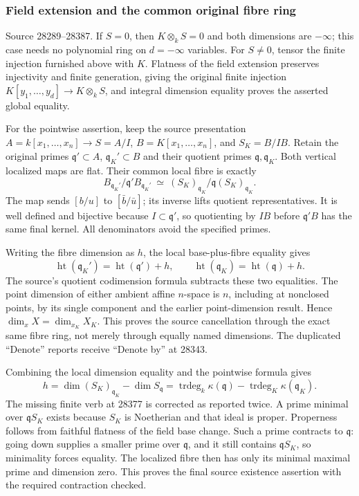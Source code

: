 \subsubsection{Field extension and the common original fibre ring}\label{field-extension-and-the-common-original-fibre-ring}

Source 28289--28387. If \(S=0\), then \(K\otimes_k S=0\) and both dimensions are \(-\infty\); this case needs no polynomial ring on \(d=-\infty\) variables. For \(S\ne0\), tensor the finite injection furnished above with \(K\). Flatness of the field extension preserves injectivity and finite generation, giving the original finite injection \(K[y_1,\ldots,y_d]\to K\otimes_kS\), and integral dimension equality proves the asserted global equality.

For the pointwise assertion, keep the source presentation \(A=k[x_1,\ldots,x_n]\to S=A/I\), \(B=K[x_1,\ldots,x_n]\), and \(S_K=B/IB\). Retain the original primes \(\mathfrak q'\subset A\), \(\mathfrak q_K'\subset B\) and their quotient primes \(\mathfrak q,\mathfrak q_K\). Both vertical localized maps are flat. Their common local fibre is exactly \[
 B_{\mathfrak q_K'}/\mathfrak q'B_{\mathfrak q_K'}
 \ \simeq\
 (S_K)_{\mathfrak q_K}/\mathfrak q(S_K)_{\mathfrak q_K}.
\] The map sends \([b/u]\) to \([\bar b/\bar u]\); its inverse lifts quotient representatives. It is well defined and bijective because \(I\subset\mathfrak q'\), so quotienting by \(IB\) before \(\mathfrak q'B\) has the same final kernel. All denominators avoid the specified primes.

Writing the fibre dimension as \(h\), the local base-plus-fibre equality gives \[
 \operatorname{ht}(\mathfrak q_K')
     =\operatorname{ht}(\mathfrak q')+h,\qquad
 \operatorname{ht}(\mathfrak q_K)
     =\operatorname{ht}(\mathfrak q)+h.
\] The source's quotient codimension formula subtracts these two equalities. The point dimension of either ambient affine \(n\)-space is \(n\), including at nonclosed points, by its single component and the earlier point-dimension result. Hence \(\dim_xX=\dim_{x_K}X_K\). This proves the source cancellation through the exact same fibre ring, not merely through equally named dimensions. The duplicated ``Denote'' reports receive ``Denote by'' at 28343.

Combining the local dimension equality and the pointwise formula gives \[
 h=\dim(S_K)_{\mathfrak q_K}-\dim S_{\mathfrak q}
   =\operatorname{trdeg}_k\kappa(\mathfrak q)
      -\operatorname{trdeg}_K\kappa(\mathfrak q_K).
\] The missing finite verb at 28377 is corrected as reported twice. A prime minimal over \(\mathfrak qS_K\) exists because \(S_K\) is Noetherian and that ideal is proper. Properness follows from faithful flatness of the field base change. Such a prime contracts to \(\mathfrak q\): going down supplies a smaller prime over \(\mathfrak q\), and it still contains \(\mathfrak qS_K\), so minimality forces equality. The localized fibre then has only its minimal maximal prime and dimension zero. This proves the final source existence assertion with the required contraction checked.

